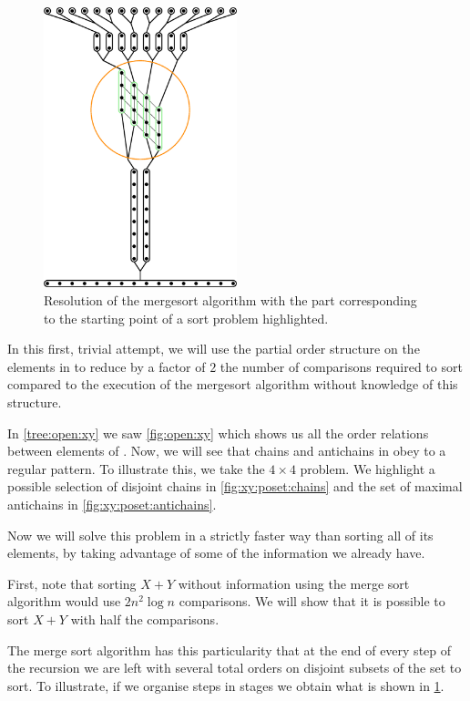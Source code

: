 \begin{figure}
\centering
\includegraphics[width=0.5\textwidth,angle=90]{fig/x+y/poset/mergexy}
\caption{Resolution of the mergesort algorithm with the part
corresponding to the starting point of a sort \XY problem highlighted.}
\label{fig:xy:poset:mergexy}
\end{figure}

In this first, trivial attempt, we will use the partial order structure on the
elements in \XY to reduce by a factor of $2$ the number of comparisons required
to sort \XY compared to the execution of the mergesort algorithm without
knowledge of this structure.

In \ref{tree:open:xy} we saw \ref{fig:open:xy} which shows us all the order
relations between elements of \XY. Now, we will see that chains and antichains
in \XY obey to a regular pattern. To illustrate this, we take the $4 \times 4$
\XY problem. We highlight a possible selection of disjoint chains in
\ref{fig:xy:poset:chains} and the set of maximal antichains in
\ref{fig:xy:poset:antichains}.

Now we will solve this problem in a strictly faster way than sorting all
of its elements, by taking advantage of some of the information we already have.

First, note that sorting $X + Y$ without information using the merge sort
algorithm would use $2 n^2 \log n$ comparisons. We will show that it is
possible to sort $X + Y$ with half the comparisons.

The merge sort algorithm has this particularity that at the end of every step
of the recursion we are left with several total orders on disjoint subsets of
the set to sort. To illustrate, if we organise steps in stages we obtain what
is shown in \ref{fig:xy:poset:mergexy}.

